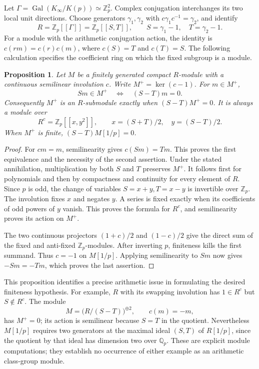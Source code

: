 \documentclass[11pt]{article}
\newtheorem{proposition}[theorem]{Proposition}
\theoremstyle{definition}\newtheorem{definition}[theorem]{Definition}
\begin{document}
Let \(\Gamma=\operatorname{Gal}(K_\infty/K(p))\simeq\mathbb Z_p^2\).
Complex conjugation interchanges its two local unit directions.
Choose generators \(\gamma_1,\gamma_2\) with
\(c\gamma_1c^{-1}=\gamma_2\), and identify
\[
 R=\mathbb Z_p[[\Gamma]]
   =\mathbb Z_p[[S,T]],\qquad S=\gamma_1-1,\quad T=\gamma_2-1 .
\]
For a module with the arithmetic conjugation action, the identity
is \(c(rm)=c(r)c(m)\), where \(c(S)=T\) and \(c(T)=S\).
The following calculation specifies the coefficient ring on which
the fixed subgroup is a module.

\begin{proposition}\label{prop:cm-plus}
Let \(M\) be a finitely generated compact \(R\)-module with a
continuous semilinear involution \(c\). Write \(M^+=\ker(c-1)\).
For \(m\in M^+\),
\[
 Sm\in M^+\quad\Longleftrightarrow\quad(S-T)m=0 .
\]
Consequently \(M^+\) is an \(R\)-submodule exactly when
\((S-T)M^+=0\). It is always a module over
\[
 R^c=\mathbb Z_p[[x,y^2]],\qquad
 x=(S+T)/2,\quad y=(S-T)/2 .
\]
When \(M^+\) is finite, \((S-T)M[1/p]=0\).
\end{proposition}
\begin{proof}
For \(cm=m\), semilinearity gives \(c(Sm)=Tm\). This proves
the first equivalence and the necessity of the second assertion.
Under the stated annihilation, multiplication by both \(S\) and
\(T\) preserves \(M^+\). It follows first for polynomials and then
by compactness and continuity for every element of \(R\).
Since \(p\) is odd, the change of variables \(S=x+y,T=x-y\) is
invertible over \(\mathbb Z_p\). The involution fixes \(x\) and
negates \(y\). A series is fixed exactly when its coefficients of
odd powers of \(y\) vanish. This proves the formula for \(R^c\),
and semilinearity proves its action on \(M^+\).

The two continuous projectors \((1+c)/2\) and \((1-c)/2\) give
the direct sum of the fixed and anti-fixed \(\mathbb Z_p\)-modules.
After inverting \(p\), finiteness kills the first summand.
Thus \(c=-1\) on \(M[1/p]\). Applying semilinearity to \(Sm\)
now gives \(-Sm=-Tm\), which proves the last assertion.
\end{proof}

This proposition identifies a precise arithmetic issue in formulating
the desired finiteness hypothesis. For example, \(R\) with its swapping
involution has \(1\in R^c\) but \(S\notin R^c\).
The module
\[
 M=\bigl(R/(S-T)\bigr)^{\oplus2},\qquad c(m)=-m,
\]
has \(M^+=0\); its action is semilinear because \(S=T\) in the
quotient. Nevertheless \(M[1/p]\) requires two generators at
the maximal ideal \((S,T)\) of \(R[1/p]\), since the quotient by
that ideal has dimension two over \(\mathbb Q_p\).
These are explicit module computations; they establish no occurrence
of either example as an arithmetic class-group module.
\end{document}
